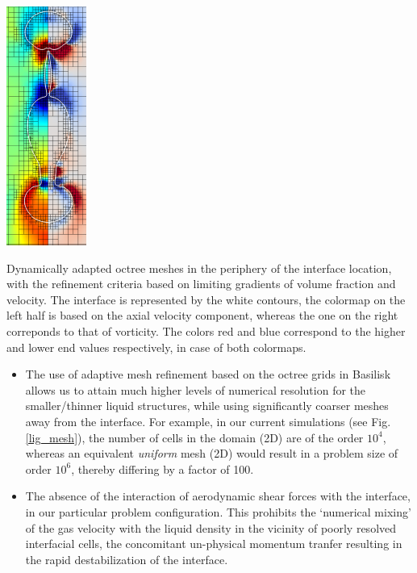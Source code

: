 \begin{marginfigure}
\centering
\includegraphics{plots/ligament_breakup/lig_mesh.pdf}
\caption{ Dynamically adapted octree meshes in the periphery 
of the interface location, with the refinement criteria based on
limiting gradients of volume fraction and velocity. The interface
is represented by the white contours, the colormap on the left half is
based on the axial velocity component, whereas the one on the right 
correponds to that of vorticity. 
The colors red and blue correspond to 
the higher and lower end values respectively, in case of both colormaps. 
	}
\label{lig_mesh}
\end{marginfigure}

\begin{itemize}
	\item The use of adaptive mesh refinement based on the octree grids in Basilisk allows 
		us to attain much higher levels of numerical resolution for the smaller/thinner 
		liquid structures, while using significantly coarser meshes away from the interface.
		For example, in our current simulations (see Fig. \ref{lig_mesh}), the number of cells
		in the domain (2D) are of the order $10^4$, whereas an equivalent \textit{uniform} mesh 
		(2D) would result in a problem size of order $10^6$, thereby differing by a factor of 100.
	\item The absence of the interaction of aerodynamic shear forces with the interface, in our particular
		problem configuration. This prohibits the `numerical mixing' of the gas velocity with the
		liquid density in the vicinity of poorly resolved interfacial cells, the concomitant 
		un-physical momentum tranfer resulting in the rapid destabilization of the interface.   
\end{itemize}

